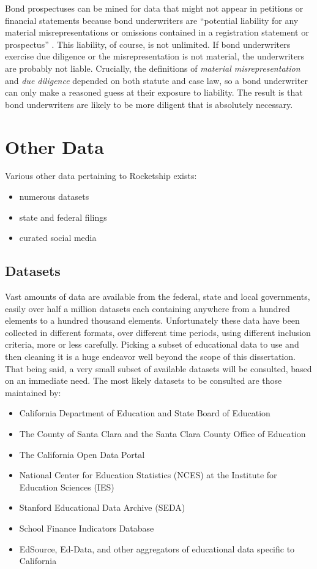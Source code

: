 Bond prospectuses can be mined for data that might not appear in petitions or financial statements because bond underwriters are ``potential liability for any material misrepresentations or omissions contained in a registration statement or prospectus'' \parencite{Block.etal2008}. This liability, of course, is not unlimited. If bond underwriters exercise due diligence or the misrepresentation is not material, the underwriters are probably not liable. Crucially, the definitions of \textit{material misrepresentation} and \textit{due diligence} depended on both statute and case law, so a bond underwriter can only make a reasoned guess at their exposure to liability. The result is that bond underwriters are likely to be more diligent that is absolutely necessary.

\section{Other Data}\label{other-data}\indent

Various other data pertaining to Rocketship exists:

\begin{itemize}
  \item numerous datasets
  \item state and federal filings
  \item curated social media
\end{itemize}

\subsection{Datasets}\label{sec:datasets}\indent

Vast amounts of data are available from the federal, state and  local governments, easily over half a million datasets each containing anywhere from a hundred elements to a hundred thousand elements. Unfortunately these data have been collected in different formats, over different time periods, using different inclusion criteria, more or less carefully. Picking a subset of educational data to use and then cleaning it is a huge endeavor well beyond the scope of this dissertation. That being said, a very small subset of available datasets will be consulted, based on an immediate need. The most likely datasets to be consulted are those maintained by:

\begin{itemize}
  \item California Department of Education and State Board of Education
  \item The County of Santa Clara and the Santa Clara County Office of Education
  \item The California Open Data Portal
  \item National Center for Education Statistics (NCES) at the Institute for Education Sciences (IES)
  \item Stanford Educational Data Archive (SEDA)
  \item School Finance Indicators Database
  \item EdSource, Ed-Data, and other aggregators of educational data specific to California
\end{itemize}

